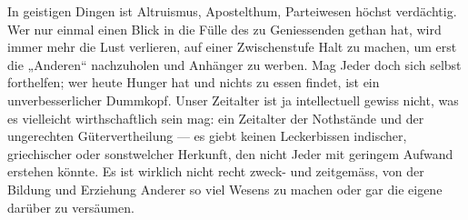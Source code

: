 In geistigen Dingen ist Altruismus, Apostelthum, Parteiwesen höchst verdächtig. Wer nur einmal einen Blick in die Fülle des zu Geniessenden gethan hat, wird immer mehr die Lust verlieren, auf einer Zwischenstufe Halt zu machen, um erst die „Anderen“ nachzuholen und Anhänger zu werben. Mag Jeder doch sich selbst forthelfen; wer heute Hunger hat und nichts zu essen findet, ist ein unverbesserlicher Dummkopf. Unser Zeitalter ist ja intellectuell gewiss nicht, was es vielleicht wirthschaftlich sein mag: ein Zeitalter der Nothstände und der ungerechten Gütervertheilung — es giebt keinen Leckerbissen indischer, griechischer oder sonstwelcher Herkunft, den nicht Jeder mit geringem Aufwand erstehen könnte. Es ist wirklich nicht recht zweck- und zeitgemäss, von der Bildung und Erziehung Anderer so viel Wesens zu machen oder gar die eigene darüber zu versäumen.
\par

